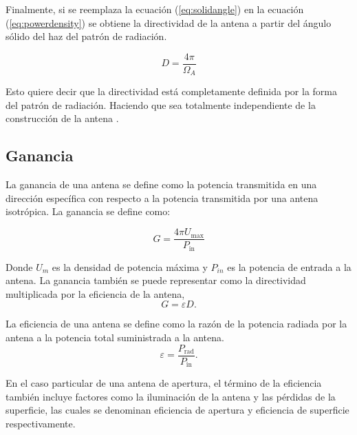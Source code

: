 Finalmente, si se reemplaza la ecuación (\ref{eq:solidangle}) en la ecuación (\ref{eq:powerdensity}) se obtiene la directividad de la antena a partir del ángulo sólido del haz del patrón de radiación.

\begin{equation}
    D = \frac{4\pi}{\Omega_{A}}
\end{equation}

Esto quiere decir que la directividad está completamente definida por la forma del patrón de radiación. Haciendo que sea totalmente independiente de la construcción de la antena \cite{stutzman2012antenna}.\\


\subsection{Ganancia}

La ganancia de una antena se define como la potencia transmitida en una dirección específica con respecto a la potencia transmitida por una antena isotrópica. La ganancia se define como:

\begin{equation}
    G = \frac{4\pi U_{\text{max}}}{P_{\text{in}}}
\end{equation}

Donde $U_{m}$ es la densidad de potencia máxima y $P_{in}$ es la potencia de entrada a la antena. La ganancia también se puede representar como la directividad multiplicada por la eficiencia de la antena,\\

\begin{equation}
    G = \varepsilon D \text{.}
\end{equation}

La eficiencia de una antena se define como la razón de la potencia radiada por la antena a la potencia total suministrada a la antena.\\

\begin{equation}
    \varepsilon = \frac{P_{\text{rad}}}{P_{\text{in}}}\text{.}
\end{equation}

En el caso particular de una antena de apertura, el término de la eficiencia también incluye factores como la iluminación de la antena y las pérdidas de la superficie, las cuales se denominan eficiencia de apertura y eficiencia de superficie respectivamente.\\


